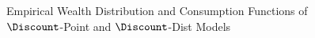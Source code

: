 \begin{figure}
\caption{Empirical Wealth Distribution and Consumption Functions of $\Discount$-Point and $\Discount$-Dist Models}
\label{CFuncDistSevenPointAndHistNetWorthPlot}
\end{figure}
